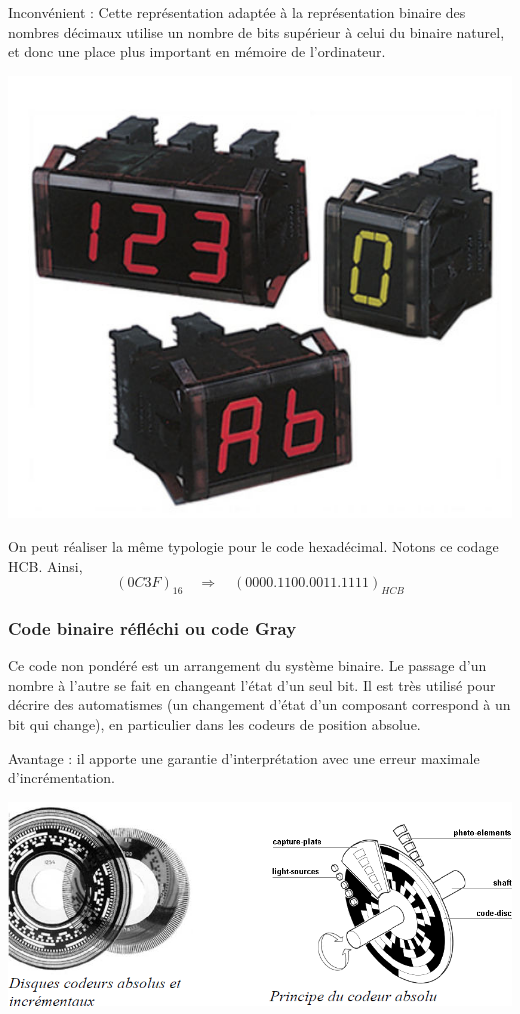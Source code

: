 \documentclass[11pt,oneside]{article}
\begin{document}
\begin{minipage}[c]{.6\linewidth}
Inconvénient : Cette représentation adaptée à la représentation binaire des nombres décimaux utilise un nombre de bits supérieur à celui du binaire naturel, et donc une place plus important en mémoire de l'ordinateur. 
\end{minipage} \hfill
\begin{minipage}[c]{.25\linewidth}
\begin{center}
\includegraphics[width=.8\textwidth]{png/fig_03}
\end{center}
\end{minipage}

\begin{rem}
On peut réaliser la même typologie pour le code hexadécimal. Notons ce codage HCB. Ainsi,
$$
(0C3F)_{16} \quad \Longrightarrow \quad (0000.1100.0011.1111)_{HCB}
$$
\end{rem}

\subsubsection{Code  binaire réfléchi ou code Gray}
Ce code non pondéré est un arrangement du système binaire. Le passage d'un nombre à l'autre se fait en changeant l'état d'un seul bit. Il est très utilisé pour décrire des automatismes (un changement d'état d'un composant correspond à un bit qui change), en particulier dans les codeurs de position absolue. 

Avantage : il apporte une garantie d'interprétation avec une erreur maximale d'incrémentation. 

\begin{center}
\includegraphics[width=.7\textwidth]{png/fig_04}
\end{center}
\end{document}
